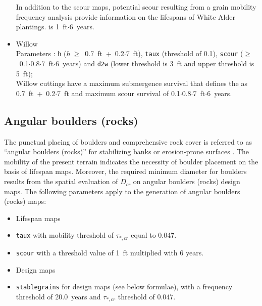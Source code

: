 \begin{itemize}
	In addition to the scour maps, potential scour resulting from a grain mobility frequency analysis provide information on the lifespans of White Alder plantings.  is 1~ft$\cdot$6~years.
	\item Willow\\
	Parameters \citep[extracted from][]{stromberg93, pasquale11, pasquale12, pasquale14}: \texttt{h} ($h~\geq $~0.7~ft~+~0.2$\cdot$7~ft), \texttt{taux} (threshold of 0.1), \texttt{scour} ($\geq$~0.1$\cdot$0.8$\cdot$7~ft$\cdot$6~years) and \texttt{d2w} (lower threshold is 3~ft and upper threshold is 5~ft);\\
	Willow cuttings have a maximum submergence survival that defines the  as 0.7~ft~+~0.2$\cdot$7~ft and maximum scour survival of 0.1$\cdot$0.8$\cdot$7~ft$\cdot$6~years.
\end{itemize}

\subsection{Angular boulders (rocks)}\label{sec:rocks}
The punctual placing of boulders and comprehensive rock cover is referred to as ``angular boulders (rocks)'' for stabilizing banks or erosion-prone surfaces \citep[e.g.,][]{maynord08}. The mobility of the present terrain indicates the necessity of boulder placement on the basis of lifespan maps. Moreover, the required minimum diameter for boulders results from the spatial evaluation of $D_{cr}$ on angular boulders (rocks) design maps. The following parameters apply to the generation of angular boulders (rocks) maps:
\begin{itemize}
	\item[] Lifespan maps
	\item \texttt{taux} with mobility threshold of $\tau_{*,cr}$ equal to 0.047.
	\item \texttt{scour} with a threshold value of 1~ft multiplied with 6 years.
	\item[] Design maps
	\item \texttt{stable{\myUnderscore}grains} for design maps (see below formulae), with a frequency threshold of 20.0~years and $\tau_{*,cr}$ threshold of 0.047.
\end{itemize}

